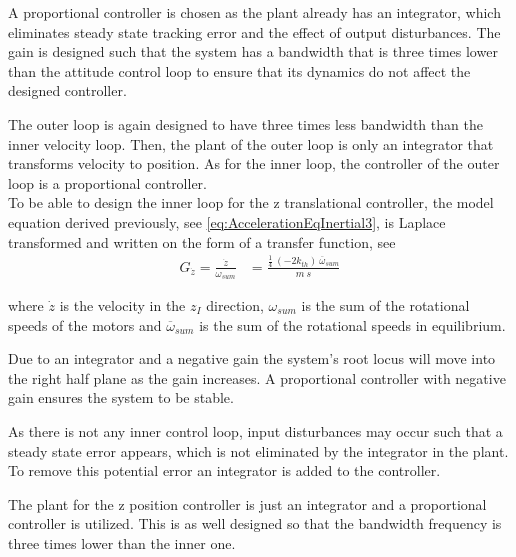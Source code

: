 A proportional controller is chosen as the plant already has an integrator, which eliminates steady state tracking error and the effect of output disturbances. The gain is designed such that the system has a bandwidth that is three times lower than the attitude control loop to ensure that its dynamics do not affect the designed controller. %

The outer loop is again designed to have three times less bandwidth than the inner velocity loop. Then, the plant of the outer loop is only an integrator that transforms velocity to position. As for the inner loop, the controller of the outer loop is a proportional controller. \\

To be able to design the inner loop for the z translational controller, the model equation derived previously, see \eqref{eq:AccelerationEqInertial3}, is Laplace transformed and written on the form of a transfer function, see
%
\begin{align}
G_{\dot{z}}=\frac{\dot{z}}{\omega_{sum}} &= \frac{ \frac{1}{4}\ (-2 k_{th})\ \overline{\omega}_{sum} }{ m\ s } \label{eq:linearTransferFunctionZ}
\end{align}

\noindent where $\dot{z}$ is the velocity in the $z_I$ direction, $\omega_{sum}$ is the sum of the rotational speeds of the motors and $\overline{\omega}_{sum}$ is the sum of the rotational speeds in equilibrium.

Due to an integrator and a negative gain the system's root locus will move into the right half plane as the gain increases. A proportional controller with negative gain ensures the system to be stable. 

As there is not any inner control loop, input disturbances may occur such that a steady state error appears, which is not eliminated by the integrator in the plant. To remove this potential error an integrator is added to the controller. 

The plant for the z position controller is just an integrator and a proportional controller is utilized. This is as well designed so that the bandwidth frequency is three times lower than the inner one.
